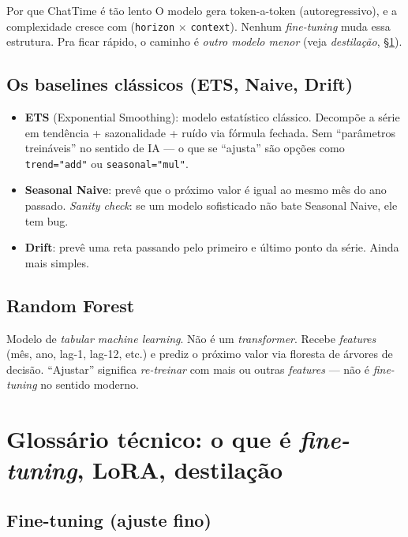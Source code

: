 \documentclass[11pt,a4paper]{article}
\newcommand{\code}[1]{\texttt{\small #1}}
\begin{document}
\begin{atencao}{Por que ChatTime é tão lento}
O modelo gera token-a-token (autoregressivo), e a complexidade cresce
com (\code{horizon} $\times$ \code{context}). Nenhum \emph{fine-tuning}
muda essa estrutura. Pra ficar rápido, o caminho é \emph{outro modelo
menor} (veja \emph{destilação}, §\ref{sec:tecnicas}).
\end{atencao}

\subsection{Os baselines clássicos (ETS, Naive, Drift)}

\begin{itemize}[leftmargin=*]
\item \textbf{ETS} (Exponential Smoothing): modelo estatístico
clássico. Decompõe a série em tendência + sazonalidade + ruído via
fórmula fechada. Sem ``parâmetros treináveis'' no sentido de IA ---
o que se ``ajusta'' são opções como \code{trend="add"} ou
\code{seasonal="mul"}.

\item \textbf{Seasonal Naive}: prevê que o próximo valor é igual ao
mesmo mês do ano passado. \emph{Sanity check}: se um modelo
sofisticado não bate Seasonal Naive, ele tem bug.

\item \textbf{Drift}: prevê uma reta passando pelo primeiro e último
ponto da série. Ainda mais simples.
\end{itemize}

\subsection{Random Forest}

Modelo de \emph{tabular machine learning}. Não é um \emph{transformer}.
Recebe \emph{features} (mês, ano, lag-1, lag-12, etc.) e prediz o
próximo valor via floresta de árvores de decisão. ``Ajustar''
significa \emph{re-treinar} com mais ou outras \emph{features} ---
não é \emph{fine-tuning} no sentido moderno.

\section{Glossário técnico: o que é \emph{fine-tuning}, LoRA, destilação}
\label{sec:tecnicas}

\subsection{Fine-tuning (ajuste fino)}
\end{document}

